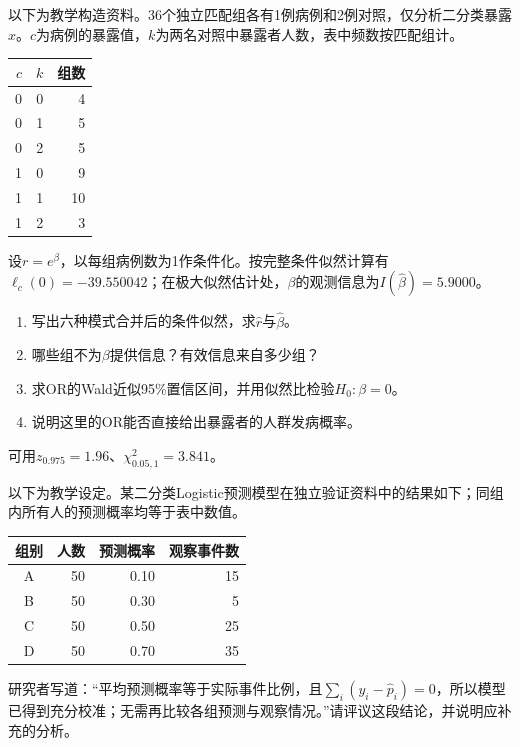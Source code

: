 以下为教学构造资料。36个独立匹配组各有1例病例和2例对照，仅分析二分类暴露$x$。$c$为病例的暴露值，$k$为两名对照中暴露者人数，表中频数按匹配组计。\begin{center}\begin{tabular}{rrr}\toprule $c$&$k$&组数\\\midrule 0&0&4\\0&1&5\\0&2&5\\1&0&9\\1&1&10\\1&2&3\\\bottomrule \end{tabular}\end{center}设$r=e^\beta$，以每组病例数为1作条件化。按完整条件似然计算有$\ell_c(0)=-39.550042$；在极大似然估计处，$\beta$的观测信息为$I(\hat\beta)=5.9000$。\begin{enumerate}\item 写出六种模式合并后的条件似然，求$\hat r$与$\hat\beta$。\item 哪些组不为$\beta$提供信息？有效信息来自多少组？\item 求OR的Wald近似95\%置信区间，并用似然比检验$H_0:\beta=0$。\item 说明这里的OR能否直接给出暴露者的人群发病概率。\end{enumerate}可用$z_{0.975}=1.96$、$\chi^2_{0.05,1}=3.841$。

以下为教学设定。某二分类Logistic预测模型在独立验证资料中的结果如下；同组内所有人的预测概率均等于表中数值。\begin{center}\begin{tabular}{crrr}\toprule 组别&人数&预测概率&观察事件数\\\midrule A&50&0.10&15\\B&50&0.30&5\\C&50&0.50&25\\D&50&0.70&35\\\bottomrule \end{tabular}\end{center}研究者写道：“平均预测概率等于实际事件比例，且$\sum_i(y_i-\hat p_i)=0$，所以模型已得到充分校准；无需再比较各组预测与观察情况。”请评议这段结论，并说明应补充的分析。
